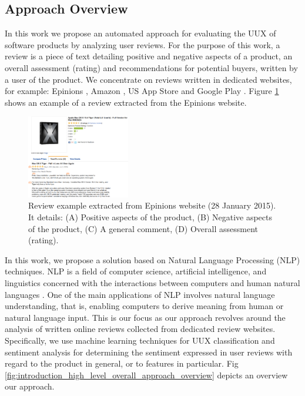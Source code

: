 \subsection{Approach Overview}

In this work we propose an automated approach for evaluating the UUX of software products by analyzing user reviews.
For the purpose of this work, a review is a piece of text detailing positive and negative aspects of a product, an overall assessment (rating) and recommendations for potential buyers, written by a user of the product. We concentrate on reviews written in dedicated websites, for example: Epinions \cite{Epinions},  Amazon \cite{Amazon}, US App Store \cite{AppStore} and Google Play \cite{GooglePlay}.  Figure \ref{fig:introduction_review_epinions} shows an example of a review extracted from the Epinions website.
 		\begin{figure}[ht]
		\raggedleft
  			\includegraphics[width=0.4\textwidth]{img/introduction_review_epinions.png}
			\caption{Review example extracted from  Epinions website (28 January 2015). It details: (A) Positive aspects of the product, (B) Negative aspects of the product, (C) A general comment, (D) Overall assessment (rating).}
			\label{fig:introduction_review_epinions}
		\end{figure}

In this work, we propose a solution based on Natural Language Processing (NLP) techniques. NLP is a field of computer science, artificial intelligence, and linguistics concerned with the interactions between computers and human natural languages \cite{Bird2009}. One of the main applications of NLP involves natural language understanding, that is, enabling computers to derive meaning from human or natural language input.  This is our focus as our approach revolves around the analysis of written online reviews collected from dedicated review websites.  Specifically, we use machine learning techniques for UUX classification and sentiment analysis for determining the sentiment expressed in user reviews with regard to the product in general, or to features in particular. Fig \ref{fig:introduction_high_level_overall_approach_overview} depicts an overview our approach. 

